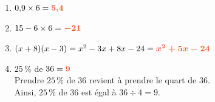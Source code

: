 \documentclass[a4paper,11pt]{article}
\newcounter{seancenum}
\begin{document}
\setcounter{seancenum}{23}
\newpage
\begin{seance}{} %

\begin{enumerate}
	\item $0{,}9 \times 6={\color[HTML]{f15929}\boldsymbol{5{,}4}}$
	\item $15-6\times6={\color[HTML]{f15929}\boldsymbol{-21}}$
	\item $(x+8)(x-3)=x^2-3x+8x-24={\color[HTML]{f15929}\boldsymbol{x^2+5x-24}}$
	\item $25\,\%$ de $36 = {\color[HTML]{f15929}\boldsymbol{9}}$\\ Prendre $25\,\%$  de $36$ revient à prendre le quart de $36$.\\
      Ainsi, $25\,\%$ de $36$ est égal à $36\div 4 =9$.
     

\end{enumerate}
\end{seance}
\end{document}
